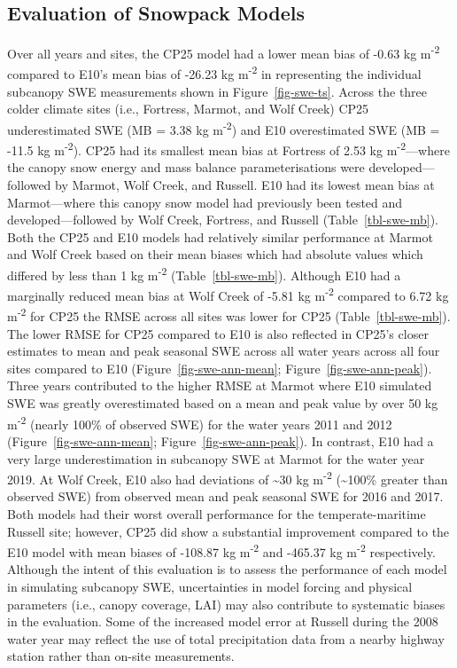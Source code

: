 \documentclass[
  letterpaper,
]{tex/uofsthesis-cs}
\begin{document}
\subsection{Evaluation of Snowpack
Models}\label{evaluation-of-snowpack-models}

Over all years and sites, the CP25 model had a lower mean bias of -0.63
kg m\textsuperscript{-2} compared to E10's mean bias of -26.23 kg
m\textsuperscript{-2} in representing the individual subcanopy SWE
measurements shown in Figure~\ref{fig-swe-ts}. Across the three colder
climate sites (i.e., Fortress, Marmot, and Wolf Creek) CP25
underestimated SWE (MB = 3.38 kg m\textsuperscript{-2}) and E10
overestimated SWE (MB = -11.5 kg m\textsuperscript{-2}). CP25 had its
smallest mean bias at Fortress of 2.53 kg m\textsuperscript{-2}---where
the canopy snow energy and mass balance parameterisations were
developed---followed by Marmot, Wolf Creek, and Russell. E10 had its
lowest mean bias at Marmot---where this canopy snow model had previously
been tested and developed---followed by Wolf Creek, Fortress, and
Russell (Table~\ref{tbl-swe-mb}). Both the CP25 and E10 models had
relatively similar performance at Marmot and Wolf Creek based on their
mean biases which had absolute values which differed by less than 1 kg
m\textsuperscript{-2} (Table~\ref{tbl-swe-mb}). Although E10 had a
marginally reduced mean bias at Wolf Creek of -5.81 kg
m\textsuperscript{-2} compared to 6.72 kg m\textsuperscript{-2} for CP25
the RMSE across all sites was lower for CP25 (Table~\ref{tbl-swe-mb}).
The lower RMSE for CP25 compared to E10 is also reflected in CP25's
closer estimates to mean and peak seasonal SWE across all water years
across all four sites compared to E10 (Figure~\ref{fig-swe-ann-mean};
Figure~\ref{fig-swe-ann-peak}). Three years contributed to the higher
RMSE at Marmot where E10 simulated SWE was greatly overestimated based
on a mean and peak value by over 50 kg m\textsuperscript{-2} (nearly
100\% of observed SWE) for the water years 2011 and 2012
(Figure~\ref{fig-swe-ann-mean}; Figure~\ref{fig-swe-ann-peak}). In
contrast, E10 had a very large underestimation in subcanopy SWE at
Marmot for the water year 2019. At Wolf Creek, E10 also had deviations
of \textasciitilde30 kg m\textsuperscript{-2} (\textasciitilde100\%
greater than observed SWE) from observed mean and peak seasonal SWE for
2016 and 2017. Both models had their worst overall performance for the
temperate-maritime Russell site; however, CP25 did show a substantial
improvement compared to the E10 model with mean biases of -108.87 kg
m\textsuperscript{-2} and -465.37 kg m\textsuperscript{-2} respectively.
Although the intent of this evaluation is to assess the performance of
each model in simulating subcanopy SWE, uncertainties in model forcing
and physical parameters (i.e., canopy coverage, LAI) may also contribute
to systematic biases in the evaluation. Some of the increased model
error at Russell during the 2008 water year may reflect the use of total
precipitation data from a nearby highway station rather than on-site
measurements.
\end{document}
